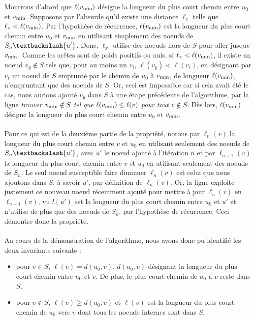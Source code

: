 Montrons d'abord que $\ell(v_\mathrm{min})$ désigne la longueur du plus court chemin entre $u_0$ et $v_\mathrm{min}$. Supposons par l'absurde qu'il existe une distance $\ell_x$ telle que $\ell_x < \ell(v_\mathrm{min})$. Par l'hypothèse de récurrence, $\ell(v_\mathrm{min})$ est la longueur du plus court chemin entre $u_0$ et $v_\mathrm{min}$ en utilisant simplement des noeuds de $S_n \textbackslash \{u'\}$. Donc, $\ell_x$ utilise des noeuds hors de $S$ pour aller jusque $v_\mathrm{min}$. Comme les arêtes sont de poids positifs ou nuls, si $\ell_x < \ell(v_\mathrm{min})$, il existe un noeud $v_y \notin S$ tels que, pour au moins un $v_i$, $\ell(v_y) < \ell(v_i)$, en désignant par $v_i$ un noeud de $S$ emprunté par le chemin de $u_0$ à $v_\mathrm{min}$, de longueur $\ell(v_\mathrm{min})$, n'empruntant que des noeuds de $S$. Or, ceci est impossible car si cela avait été le cas, nous aurions ajouté $v_y$ dans $S$ à une étape précédente de l'algorithme, par la ligne \textit{trouver $v_\mathrm{min} \notin S$ tel que $\ell(v_\mathrm{min}) \leq \ell(v)$ pour tout $v \notin S$}. Dès lors, $\ell(v_\mathrm{min})$ désigne la longueur du plus court chemin entre $u_0$ et $v_\mathrm{min}$.

\paragraph{}

Pour ce qui est de la deuxième partie de la propriété, notons par $\ell_{n}(v)$ la longueur du plus court chemin entre $v$ et $u_0$ en utilisant seulement des noeuds de $S_n \textbackslash \{u'\}$, avec $u'$ le noeud ajouté à l'itération $n$ et par $\ell_{n+1}(v)$ la longueur du plus court chemin entre $v$ et $u_0$ en utilisant seulement des noeuds de $S_n$. Le seul noeud susceptible faire diminuer $\ell_{n}(v)$ est celui que nous ajoutons dans $S$, à savoir $u'$, par définition de $\ell_{n}(v)$. Or, la ligne  exploite justement ce nouveau noeud récemment ajouté pour mettre à jour $\ell_{n}(v)$ en $\ell_{n+1}(v)$, vu $l(u')$ est la longueur du plus court chemin entre $u_0$ et $u'$ et n'utilise de plus que des noeuds de $S_n$, par l'hypothèse de récurrence. Ceci démontre donc la propriété.

\paragraph{}

Au cours de la démonstration de l'algorithme, nous avons donc pu identifié les deux invariants suivants : 
\begin{itemize}
	\item pour $v \in S$, $\ell(v)=d(u_0,v)$, $d(u_0,v)$ désignant la longueur du plus court chemin entre $u_0$ et $v$. De plus, le plus court chemin de $u_0$ à $v$ reste dans $S$.
	\item pour $v \notin S$, $\ell(v) \geq d(u_0,v)$ et $\ell(v)$ est la longueur du plus court chemin de $u_0$ vers $v$ dont tous les noeuds internes sont dans $S$.
\end{itemize}

